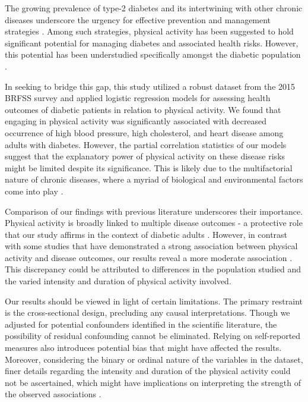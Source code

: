 \documentclass[11pt]{article}
\begin{document}
The growing prevalence of type-2 diabetes and its intertwining with other chronic diseases underscore the urgency for effective prevention and management strategies \cite{Nyberg2020AssociationOH}. Among such strategies, physical activity has been suggested to hold significant potential for managing diabetes and associated health risks. However, this potential has been understudied specifically amongst the diabetic population \cite{Solanki2015EXERCISEAT, Colberg2010ExerciseAT, Kruk2007PhysicalAI}.

In seeking to bridge this gap, this study utilized a robust dataset from the 2015 BRFSS survey and applied logistic regression models for assessing health outcomes of diabetic patients in relation to physical activity. We found that engaging in physical activity was significantly associated with decreased occurrence of high blood pressure, high cholesterol, and heart disease among adults with diabetes. However, the partial correlation statistics of our models suggest that the explanatory power of physical activity on these disease risks might be limited despite its significance. This is likely due to the multifactorial nature of chronic diseases, where a myriad of biological and environmental factors come into play \cite{Barquera2016CardiovascularDI}.

Comparison of our findings with previous literature underscores their importance. Physical activity is broadly linked to multiple disease outcomes - a protective role that our study affirms in the context of diabetic adults \cite{Hamer2012LowDosePA, Mora2007PhysicalAA}. However, in contrast with some studies that have demonstrated a strong association between physical activity and disease outcomes, our results reveal a more moderate association \cite{Franssen2020CanCW}. This discrepancy could be attributed to differences in the population studied and the varied intensity and duration of physical activity involved.

Our results should be viewed in light of certain limitations. The primary restraint is the cross-sectional design, precluding any causal interpretations. Though we adjusted for potential confounders identified in the scientific literature, the possibility of residual confounding cannot be eliminated. Relying on self-reported measures also introduces potential bias that might have affected the results. Moreover, considering the binary or ordinal nature of the variables in the dataset, finer details regarding the intensity and duration of the physical activity could not be ascertained, which might have implications on interpreting the strength of the observed associations \cite{Kruk2007PhysicalAI}.
\end{document}
